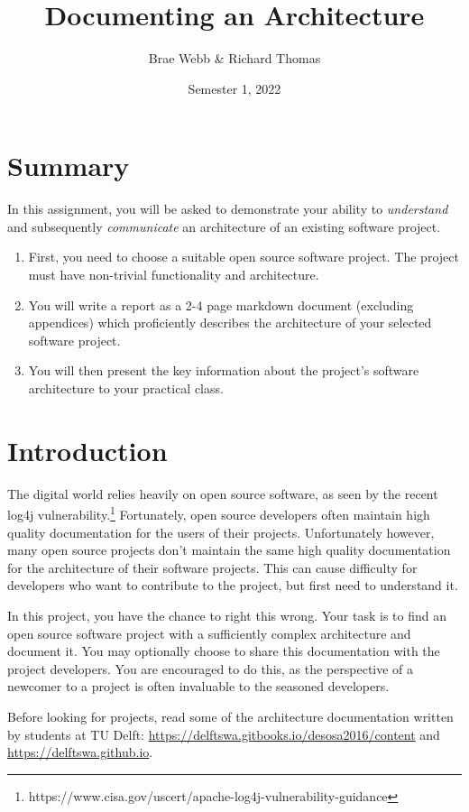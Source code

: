 \documentclass{csse4400}
\title{Documenting an Architecture}
\author{Brae Webb \& Richard Thomas}
\date{Semester 1, 2022}
\begin{document}
\maketitle

\section*{Summary}
In this assignment, you will be asked to demonstrate your ability to
\textsl{understand} and subsequently \textsl{communicate} an architecture of an existing software project.
\begin{enumerate}
    \item First, you need to choose a suitable open source software project.
             The project must have non-trivial functionality and architecture.
    \item You will write a report as a 2-4 page markdown document (excluding appendices) which 
             proficiently describes the architecture of your selected software project.
    \item You will then present the key information about the project's
             software architecture to your practical class.
\end{enumerate}

\section{Introduction}
The digital world relies heavily on open source software, as seen by the recent log4j vulnerability.\footnote{https://www.cisa.gov/uscert/apache-log4j-vulnerability-guidance}
Fortunately, open source developers often maintain high quality documentation for the users of their projects.
Unfortunately however, many open source projects don't maintain the same high quality documentation for the architecture of their software projects.
This can cause difficulty for developers who want to contribute to the project, but first need to understand it.

In this project, you have the chance to right this wrong.
Your task is to find an open source software project with a sufficiently complex architecture and document it.
You may optionally choose to share this documentation with the project developers.
You are encouraged to do this, as the perspective of a newcomer to a project is often invaluable to the seasoned developers.

Before looking for projects, read some of the architecture documentation written by students at TU Delft:
\url{https://delftswa.gitbooks.io/desosa2016/content} and \url{https://delftswa.github.io}.
\end{document}
